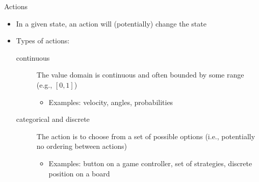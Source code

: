 \documentclass[aspectratio=169]{../latex_main/tntbeamer}  %
\begin{document}
\begin{frame}[c]{Actions}
	
	\begin{itemize}
		\item In a given state, an action will (potentially) change the state 
		\medskip
		\pause
		\item Types of actions:
		\begin{description}
			\item[continuous] The value domain is continuous and often bounded by some range (e.g., $[0,1]$)
			\begin{itemize}
				\item Examples: velocity, angles, probabilities
			\end{itemize}
			\pause
			\item[categorical and discrete] The action is to choose from a set of possible options (i.e., potentially no ordering between actions)
			\begin{itemize}
				\item Examples: button on a game controller, set of strategies, discrete position on a board
			\end{itemize}
		\end{description}
	\end{itemize}
	
\end{frame}
\end{document}
